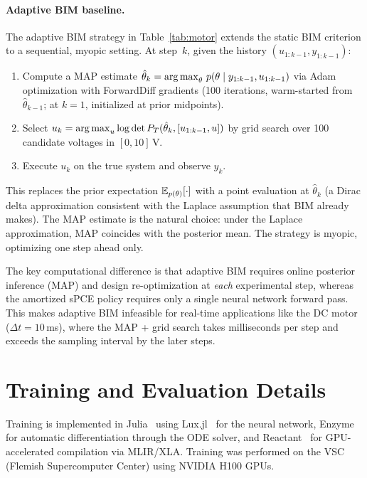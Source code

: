 \paragraph{Adaptive BIM baseline.}
The adaptive BIM strategy in Table~\ref{tab:motor} extends the static BIM criterion to a sequential, myopic setting. At step~$k$, given the history $(u_{1:k-1}, y_{1:k-1})$:
\begin{enumerate}
\item Compute a MAP estimate $\hat{\theta}_k = \operatorname*{arg\,max}_\theta\, p(\theta \mid y_{1:k-1}, u_{1:k-1})$ via Adam optimization with ForwardDiff gradients (100 iterations, warm-started from $\hat{\theta}_{k-1}$; at $k=1$, initialized at prior midpoints).
\item Select $u_k = \operatorname*{arg\,max}_{u} \log\det P_T(\hat{\theta}_k, [u_{1:k-1}, u])$ by grid search over 100 candidate voltages in $[0, 10]\,$V.
\item Execute $u_k$ on the true system and observe $y_k$.
\end{enumerate}
This replaces the prior expectation $\operatorname{\mathbb{E}}_{p(\theta)}[\cdot]$ with a point evaluation at $\hat{\theta}_k$ (a Dirac delta approximation consistent with the Laplace assumption that BIM already makes). The MAP estimate is the natural choice: under the Laplace approximation, MAP coincides with the posterior mean. The strategy is myopic, optimizing one step ahead only.

The key computational difference is that adaptive BIM requires online posterior inference (MAP) and design re-optimization at \emph{each} experimental step, whereas the amortized sPCE policy requires only a single neural network forward pass. This makes adaptive BIM infeasible for real-time applications like the DC motor ($\Delta t = 10\,$ms), where the MAP + grid search takes milliseconds per step and exceeds the sampling interval by the later steps.

\section{Training and Evaluation Details}
\label{sec:training_details}

Training is implemented in Julia~\cite{bezanson2017julia} using Lux.jl~\cite{pal2023lux} for the neural network, Enzyme~\cite{moses2020enzyme} for automatic differentiation through the ODE solver, and Reactant~\cite{reactant2025} for GPU-accelerated compilation via MLIR/XLA. Training was performed on the VSC (Flemish Supercomputer Center) using NVIDIA H100 GPUs.


